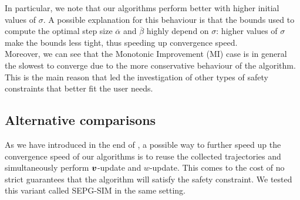 In particular, we note that our algorithms perform better with higher initial values of $\sigma$. A possible explanation for this behaviour is that the bounds used to compute the optimal step size $\overline{\alpha}$ and $\overline{\beta}$ highly depend on $\sigma$: higher values of $\sigma$ make the bounds less tight, thus speeding up convergence speed.\\
Moreover, we can see that the Monotonic Improvement (MI) case is in general the slowest to converge due to the more conservative behaviour of the algorithm. This is the main reason that led the investigation of other types of safety constraints that better fit the user needs.


\begin{table}[t]

\caption[Upper bound confidence interval for LQG problem.]{Upper bound confidence intervals at 95\% of $|\vv - \vv^*|$ after 10,000 iterations.}\label{exp:convergence-speed}
\end{table}


\subsection{Alternative comparisons}

As we have introduced in the end of , a possible way to further speed up the convergence speed of our algorithms is to reuse the collected trajectories and simultaneously perform $\boldsymbol{v}$-update and $w$-update. This comes to the cost of no strict guarantees that the algorithm will satisfy the safety constraint. We tested this variant called SEPG-SIM in the same setting.

